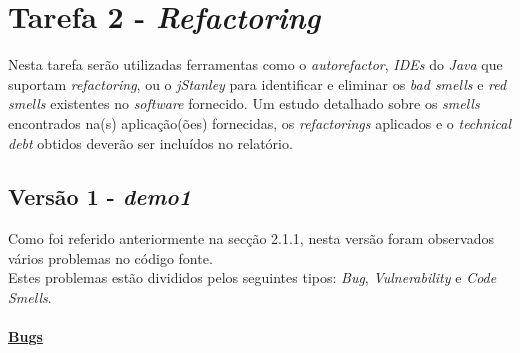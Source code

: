 \documentclass[a4paper]{report}
\begin{document}
\section{Tarefa 2 - \textit{Refactoring}}
Nesta tarefa serão utilizadas ferramentas como o \textit{autorefactor}, \textit{IDEs} do \textit{Java} que suportam \textit{refactoring}, ou o \textit{jStanley} para identificar e eliminar os \textit{bad smells} e \textit{red smells} existentes no \textit{software} fornecido. Um estudo detalhado sobre os \textit{smells} encontrados na(s) aplicação(ões) fornecidas, os \textit{refactorings} aplicados e o \textit{technical debt} obtidos deverão ser incluídos no relatório.

\subsection{Versão 1 - \textit{demo1}}
Como foi referido anteriormente na secção 2.1.1, nesta versão foram observados vários problemas no código fonte.\\
Estes problemas estão divididos pelos seguintes tipos: \textit{Bug}, \textit{Vulnerability} e \textit{Code Smells}.\\\\
\underline{\textbf{Bugs}}
\end{document}
